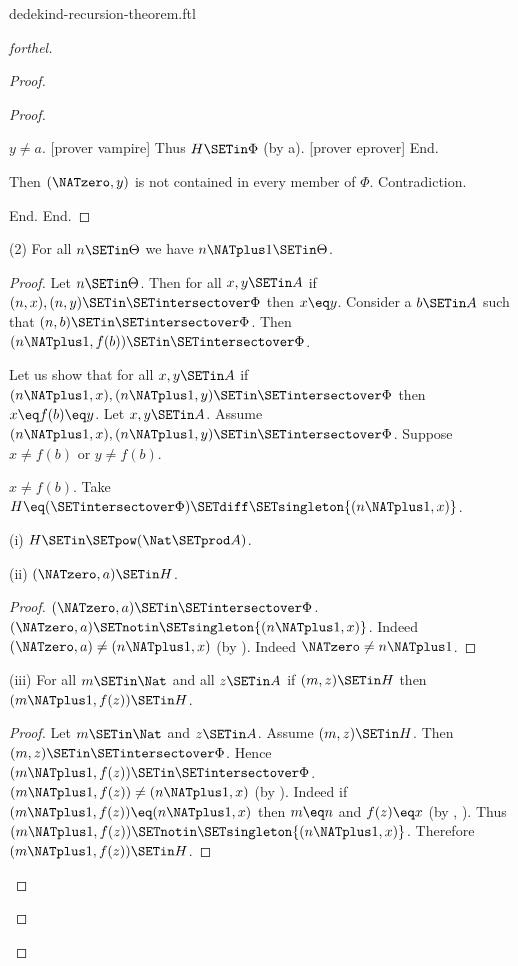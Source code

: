\documentclass{naproche-library}
\begin{document}
\begin{smodule}[title=Dedekind's Recursion Theorem]{dedekind-recursion-theorem.ftl}
\begin{proof}[forthel]
\begin{proof}
\begin{proof}
\begin{case}{$y \neq a$.}
              [prover vampire]
              Thus $H \SETin \Phi$ (by a).
              [prover eprover]
            End.

            Then $(\NATzero,y)$ is not contained in every member of $\Phi$.
            Contradiction.
          \end{case}
        End.
      End.
    \end{proof}

    (2) For all $n \SETin \Theta$ we have $n \NATplus 1 \SETin \Theta$.
    \begin{proof}
      Let $n \SETin \Theta$.
      Then for all $x, y \SETin A$ if $(n, x), (n, y) \SETin \SETintersectover \Phi$ then
      $x \eq y$.
      Consider a $b \SETin A$ such that $(n,b) \SETin \SETintersectover \Phi$.
      Then $(n \NATplus 1, f(b)) \SETin \SETintersectover \Phi$.

      Let us show that for all $x, y \SETin A$ if $(n \NATplus 1, x),
      (n \NATplus 1, y) \SETin \SETintersectover \Phi$ then $x \eq f(b) \eq y$.
        Let $x, y \SETin A$.
        Assume $(n \NATplus 1, x), (n \NATplus 1, y) \SETin \SETintersectover \Phi$.
        Suppose $x \neq f(b)$ or $y \neq f(b)$.

        \begin{case}{$x \neq f(b)$.}
          Take $H \eq (\SETintersectover \Phi) \SETdiff \SETsingleton{(n \NATplus 1,x)}$.

          (i) $H \SETin \SETpow(\Nat \SETprod A)$.

          (ii) $(\NATzero,a) \SETin H$.
          \begin{proof}
            $(\NATzero,a) \SETin \SETintersectover \Phi$.
            $(\NATzero,a) \SETnotin \SETsingleton{(n \NATplus 1,x)}$.
            Indeed $(\NATzero,a) \neq (n \NATplus 1,x)$ (by ).
            Indeed $\NATzero \neq n \NATplus 1$.
          \end{proof}

          (iii) For all $m \SETin \Nat$ and all $z \SETin A$ if $(m,z) \SETin H$ then $(m \NATplus 1,f(z)) \SETin H$.
          \begin{proof}
            Let $m \SETin \Nat$ and $z \SETin A$.
            Assume $(m,z) \SETin H$.
            Then $(m,z) \SETin \SETintersectover \Phi$.
            Hence $(m \NATplus 1,f(z)) \SETin \SETintersectover \Phi$.
            $(m \NATplus 1,f(z)) \neq (n \NATplus 1,x)$ (by ).
            Indeed if $(m \NATplus 1,f(z)) \eq (n \NATplus 1,x)$ then $m \eq n$ and $f(z) \eq x$ (by , ).
            Thus $(m \NATplus 1,f(z)) \SETnotin \SETsingleton{(n \NATplus 1,x)}$.
            Therefore $(m \NATplus 1,f(z)) \SETin H$.
          \end{proof}


\end{case}
\end{proof}
\end{proof}
\end{proof}
\end{smodule}
\end{document}
